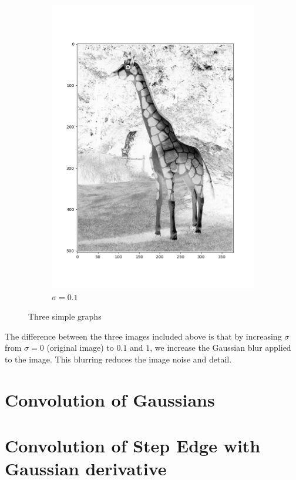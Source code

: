 \documentclass[12pt, oneside]{article}
\begin{document}
\begin{figure}[H]
\begin{subfigure}[b]{0.3\textwidth}
        \includegraphics[width=\textwidth]{imgs/q1_plot2.png}
        \caption{$\sigma = 0.1$}
        \label{fig:five over x}
    \end{subfigure}
       \caption{Three simple graphs}
       \label{fig:three graphs}
\end{figure}

The difference between the three images included above is that by increasing 
$\sigma$ from $\sigma = 0$ (original image) to $0.1$ and $1$, we increase the 
Gaussian blur applied to the image. This blurring reduces the image noise and 
detail.


\section{Convolution of Gaussians}

\section{Convolution of Step Edge with Gaussian derivative}
\end{document}
